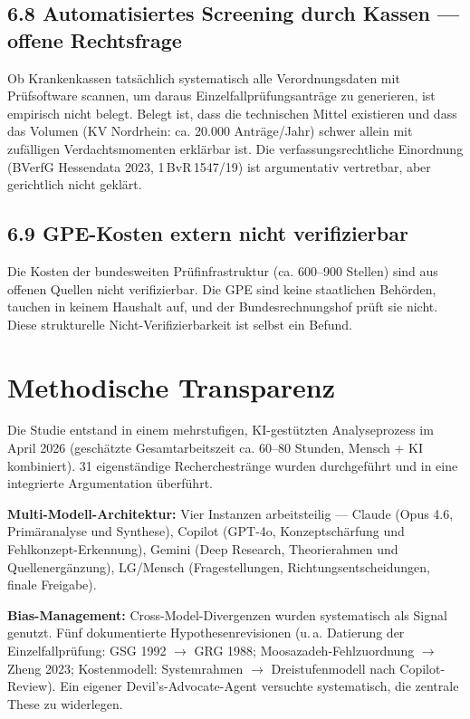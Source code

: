 \documentclass{umbruch-position}
\begin{document}
\subsection*{6.8 Automatisiertes Screening durch Kassen --- offene Rechtsfrage}

Ob Krankenkassen tats\"achlich systematisch alle Verordnungsdaten mit Pr\"ufsoftware scannen, um daraus Einzelfallpr\"ufungsantr\"age zu generieren, ist empirisch nicht belegt. Belegt ist, dass die technischen Mittel existieren und dass das Volumen (KV Nordrhein: ca. 20.000 Antr\"age/Jahr) schwer allein mit zuf\"alligen Verdachtsmomenten erkl\"arbar ist. Die verfassungsrechtliche Einordnung (BVerfG Hessendata 2023, 1\,BvR\,1547/19) ist argumentativ vertretbar, aber gerichtlich nicht gekl\"art.

\subsection*{6.9 GPE-Kosten extern nicht verifizierbar}

Die Kosten der bundesweiten Pr\"ufinfrastruktur (ca. 600--900 Stellen) sind aus offenen Quellen nicht verifizierbar. Die GPE sind keine staatlichen Beh\"orden, tauchen in keinem Haushalt auf, und der Bundesrechnungshof pr\"uft sie nicht. Diese strukturelle Nicht-Verifizierbarkeit ist selbst ein Befund.

\section{Methodische Transparenz}

Die Studie entstand in einem mehrstufigen, KI-gest\"utzten Analyseprozess im April 2026 (gesch\"atzte Gesamtarbeitszeit ca. 60--80 Stunden, Mensch + KI kombiniert). 31 eigenst\"andige Recherchestr\"ange wurden durchgef\"uhrt und in eine integrierte Argumentation \"uberf\"uhrt.

\textbf{Multi-Modell-Architektur:} Vier Instanzen arbeitsteilig --- Claude (Opus 4.6, Prim\"aranalyse und Synthese), Copilot (GPT-4o, Konzeptsch\"arfung und Fehlkonzept-Erkennung), Gemini (Deep Research, Theorierahmen und Quellenerg\"anzung), LG/Mensch (Fragestellungen, Richtungsentscheidungen, finale Freigabe).

\textbf{Bias-Management:} Cross-Model-Divergenzen wurden systematisch als Signal genutzt. F\"unf dokumentierte Hypothesenrevisionen (u.\,a. Datierung der Einzelfallpr\"ufung: GSG 1992 $\to$ GRG 1988; Moosazadeh-Fehlzuordnung $\to$ Zheng 2023; Kostenmodell: Systemrahmen $\to$ Dreistufenmodell nach Copilot-Review). Ein eigener Devil's-Advocate-Agent versuchte systematisch, die zentrale These zu widerlegen.
\end{document}
